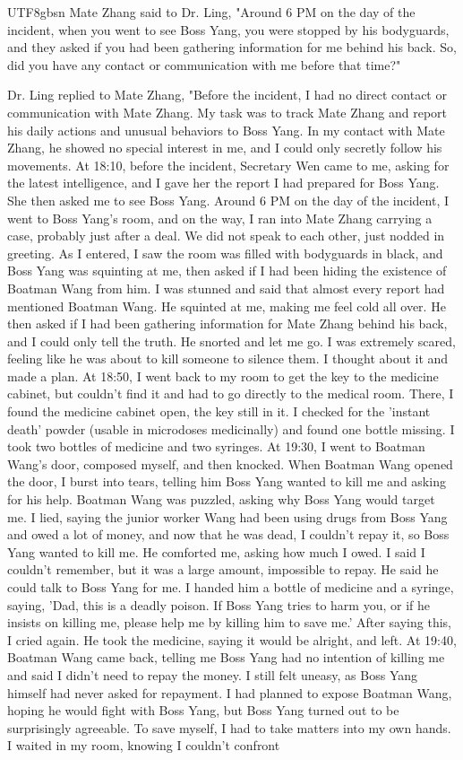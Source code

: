 \documentclass[11pt]{article}
\begin{document}
{\begin{CJK}{UTF8}{gbsn}
Mate Zhang said to Dr. Ling, "Around 6 PM on the day of the incident, when you went to see Boss Yang, you were stopped by his bodyguards, and they asked if you had been gathering information for me behind his back. So, did you have any contact or communication with me before that time?"

Dr. Ling replied to Mate Zhang, "Before the incident, I had no direct contact or communication with Mate Zhang. My task was to track Mate Zhang and report his daily actions and unusual behaviors to Boss Yang. In my contact with Mate Zhang, he showed no special interest in me, and I could only secretly follow his movements. At 18:10, before the incident, Secretary Wen came to me, asking for the latest intelligence, and I gave her the report I had prepared for Boss Yang. She then asked me to see Boss Yang. Around 6 PM on the day of the incident, I went to Boss Yang's room, and on the way, I ran into Mate Zhang carrying a case, probably just after a deal. We did not speak to each other, just nodded in greeting. As I entered, I saw the room was filled with bodyguards in black, and Boss Yang was squinting at me, then asked if I had been hiding the existence of Boatman Wang from him. I was stunned and said that almost every report had mentioned Boatman Wang. He squinted at me, making me feel cold all over. He then asked if I had been gathering information for Mate Zhang behind his back, and I could only tell the truth. He snorted and let me go. I was extremely scared, feeling like he was about to kill someone to silence them. I thought about it and made a plan. At 18:50, I went back to my room to get the key to the medicine cabinet, but couldn’t find it and had to go directly to the medical room. There, I found the medicine cabinet open, the key still in it. I checked for the 'instant death' powder (usable in microdoses medicinally) and found one bottle missing. I took two bottles of medicine and two syringes. At 19:30, I went to Boatman Wang's door, composed myself, and then knocked. When Boatman Wang opened the door, I burst into tears, telling him Boss Yang wanted to kill me and asking for his help. Boatman Wang was puzzled, asking why Boss Yang would target me. I lied, saying the junior worker Wang had been using drugs from Boss Yang and owed a lot of money, and now that he was dead, I couldn't repay it, so Boss Yang wanted to kill me. He comforted me, asking how much I owed. I said I couldn’t remember, but it was a large amount, impossible to repay. He said he could talk to Boss Yang for me. I handed him a bottle of medicine and a syringe, saying, 'Dad, this is a deadly poison. If Boss Yang tries to harm you, or if he insists on killing me, please help me by killing him to save me.' After saying this, I cried again. He took the medicine, saying it would be alright, and left. At 19:40, Boatman Wang came back, telling me Boss Yang had no intention of killing me and said I didn't need to repay the money. I still felt uneasy, as Boss Yang himself had never asked for repayment. I had planned to expose Boatman Wang, hoping he would fight with Boss Yang, but Boss Yang turned out to be surprisingly agreeable. To save myself, I had to take matters into my own hands. I waited in my room, knowing I couldn’t confront 
\end{CJK}}
\end{document}
